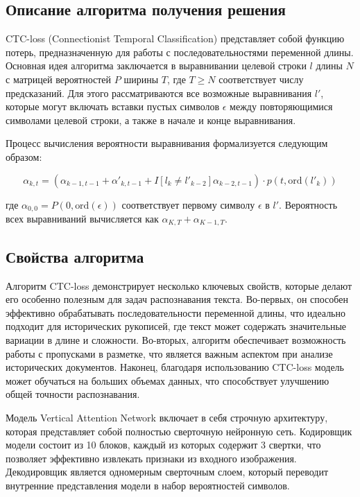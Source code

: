 \documentclass{article}
\begin{document}
\subsection{Описание алгоритма получения решения}
CTC-loss (Connectionist Temporal Classification) представляет собой функцию потерь, предназначенную для работы с последовательностями переменной длины. Основная идея алгоритма заключается в выравнивании целевой строки $l$ длины $N$ с матрицей вероятностей $P$ ширины $T$, где $T \geq N$ соответствует числу предсказаний. Для этого рассматриваются все возможные выравнивания $l'$, которые могут включать вставки пустых символов $\epsilon$ между повторяющимися символами целевой строки, а также в начале и конце выравнивания.

Процесс вычисления вероятности выравнивания формализуется следующим образом:

\begin{equation}
\alpha_{k,t} = (\alpha_{k-1,t-1} + \alpha'_{k,t-1} + I[l_k \neq l'_{k-2}]\alpha_{k-2,t-1}) \cdot p(t, \text{ord}(l'_k))
\end{equation}

где $\alpha_{0,0} = P(0, \text{ord}(\epsilon))$ соответствует первому символу $\epsilon$ в $l'$. Вероятность всех выравниваний вычисляется как $\alpha_{K,T} + \alpha_{K-1,T}$.

\subsection{Свойства алгоритма}
Алгоритм CTC-loss демонстрирует несколько ключевых свойств, которые делают его особенно полезным для задач распознавания текста. Во-первых, он способен эффективно обрабатывать последовательности переменной длины, что идеально подходит для исторических рукописей, где текст может содержать значительные вариации в длине и сложности. Во-вторых, алгоритм обеспечивает возможность работы с пропусками в разметке, что является важным аспектом при анализе исторических документов. Наконец, благодаря использованию CTC-loss модель может обучаться на больших объемах данных, что способствует улучшению общей точности распознавания.

Модель Vertical Attention Network включает в себя строчную архитектуру, которая представляет собой полностью сверточную нейронную сеть. Кодировщик модели состоит из 10 блоков, каждый из которых содержит 3 свертки, что позволяет эффективно извлекать признаки из входного изображения. Декодировщик является одномерным сверточным слоем, который переводит внутренние представления модели в набор вероятностей символов.
\end{document}

